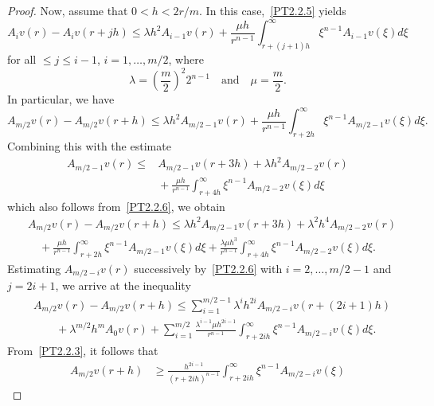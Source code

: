 \documentclass[10pt,a4paper]{amsart}
\begin{document}
\begin{proof}
Now, assume that $0 < h < 2 r / m$. In this case,~\eqref{PT2.2.5} yields
\begin{equation}
	A_i v (r) - A_i v (r + j h)
	\le
	\lambda
	h^2
	A_{i - 1} v (r)
	+
	\frac{
		\mu h
	}{
		r^{n - 1}
	}
	\int_{r + (j + 1) h}^\infty
	\xi^{n - 1}
	A_{i-1} v (\xi)
	d\xi
	\label{PT2.2.6}
\end{equation}
for all $ \le j \le i - 1$, $i = 1, \ldots, m / 2$,
where
$$
	\lambda
	=
	\left(
		\frac{m}{2}
	\right)^2
	2^{n - 1}
	\quad
	\mbox{and}
	\quad
	\mu
	=
	\frac{m}{2}.
$$
In particular, we have
$$
	A_{m / 2} v (r) - A_{m / 2} v (r + h)
	\le
	\lambda
	h^2
	A_{m / 2 - 1} v (r)
	+
	\frac{
		\mu h
	}{
		r^{n - 1}
	}
	\int_{r + 2 h}^\infty
	\xi^{n - 1}
	A_{m / 2 - 1} v (\xi)
	d\xi.
$$
Combining this with the estimate
\begin{align*}
	A_{m / 2 - 1} v (r) 
	\le
	{}
	& 
	A_{m / 2 - 1} v (r + 3 h)
	+
	\lambda
	h^2
	A_{m / 2 - 2} v (r)
	\\
	&
	{}
	+
	\frac{
		\mu h
	}{
		r^{n - 1}
	}
	\int_{r + 4 h}^\infty
	\xi^{n - 1}
	A_{m / 2 - 2} v (\xi)
	d\xi
\end{align*}
which also follows from~\eqref{PT2.2.6}, we obtain
\begin{align*}
	&
	A_{m / 2} v (r) - A_{m / 2} v (r + h)
	\le
	\lambda
	h^2
	A_{m / 2 - 1} v (r + 3 h)
	+
	\lambda^2
	h^4
	A_{m / 2 - 2} v (r)
	\\
	&
	\quad
	{}
	+
	\frac{
		\mu h
	}{
		r^{n - 1}
	}
	\int_{r + 2 h}^\infty
	\xi^{n - 1}
	A_{m / 2 - 1} v (\xi)
	d\xi
	+
	\frac{
		\lambda 
		\mu 
		h^3
	}{
		r^{n - 1}
	}
	\int_{r + 4 h}^\infty
	\xi^{n - 1}
	A_{m / 2 - 2} v (\xi)
	d\xi.
\end{align*}
Estimating $A_{m / 2 - i} v (r)$ successively by~\eqref{PT2.2.6} with $i = 2, \ldots, m / 2 - 1$ and $j = 2 i + 1$, we arrive at the inequality
\begin{align}
	&
	A_{m / 2} v (r) - A_{m / 2} v (r + h)
	\le
	\sum_{i = 1}^{m / 2 - 1}
	\lambda^i h^{2 i}
	A_{m / 2 - i} v (r + (2 i + 1) h)
	\label{PT2.2.7}
	\\
	&
	\qquad
	{}
	+
	\lambda^{m / 2}
	h^m
	A_0 v (r)
	+
	\sum_{i = 1}^{m / 2}
	\frac{
		\lambda^{i - 1}
		\mu
		h^{2 i - 1}
	}{
		r^{n - 1}
	}
	\int_{r + 2 i h}^\infty
	\xi^{n - 1}
	A_{m / 2 - i} v (\xi)
	d\xi.
	\nonumber
\end{align}
From~\eqref{PT2.2.3}, it follows that
\begin{align*}
	A_{m / 2} v (r + h)
	&
	{}
	\ge
	\frac{
		h^{2 i - 1}
	}{
		(r + 2 i h)^{n - 1}
	}
	\int_{r + 2 i h}^\infty
	\xi^{n - 1}
	A_{m / 2 - i} v (\xi)

\end{align*}
\end{proof}
\end{document}
